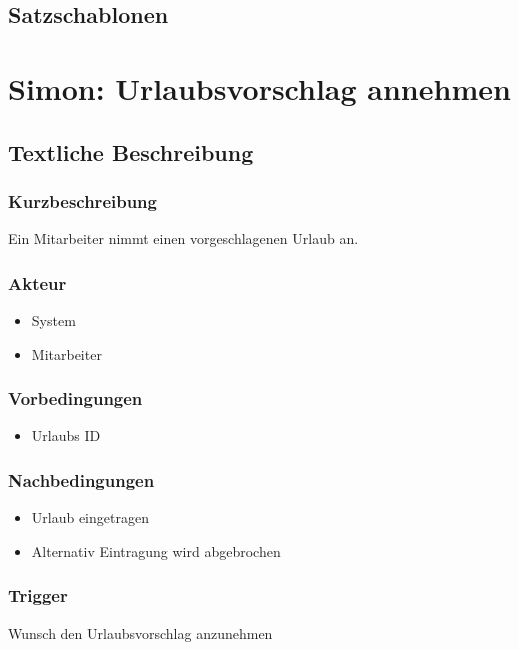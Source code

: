 \subsection{Satzschablonen}

\section{Simon: Urlaubsvorschlag annehmen}

\subsection{Textliche Beschreibung}

\subsubsection{Kurzbeschreibung}
Ein Mitarbeiter nimmt einen vorgeschlagenen Urlaub an.

\subsubsection{Akteur}
\begin{itemize}
	\item System
	\item Mitarbeiter
\end{itemize}

\subsubsection{Vorbedingungen}
\begin{itemize}
	\item Urlaubs ID
\end{itemize}

\subsubsection{Nachbedingungen}
\begin{itemize}
	\item Urlaub eingetragen
	\item Alternativ Eintragung wird abgebrochen
\end{itemize}

\subsubsection{Trigger}
Wunsch den Urlaubsvorschlag anzunehmen

